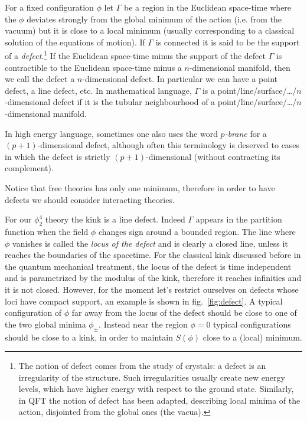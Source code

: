 \documentclass[../main/main.tex]{subfiles}
\begin{document}
For a fixed configuration $\phi$ let $\Gamma$ be a region in the Euclidean space-time where the $\phi$ deviates strongly from the global minimum of the action (i.e. from the vacuum) but it is close to a local minimum (usually corresponding to a classical solution of the equations of motion). 
If $\Gamma$ is connected it is said to be the support of a \emph{defect}.\footnote{The notion of defect comes from the study of crystals: a defect is an irregularity of the structure. Such irregularities usually create new energy levels, which have higher energy with respect to the ground state. Similarly, in QFT the notion of defect has been adapted, describing local minima of the action, disjointed from the global ones (the vacua).} 
If the Euclidean space-time minus the support of the defect $\Gamma$ is contractible to the Euclidean space-time minus a $n$-dimensional manifold, then we call the defect a $n$-dimensional defect. In particular we can have a point defect, a line defect, etc. In mathematical language, $\Gamma$ is a point/line/surface/\ldots/$n$-dimensional defect if it is the tubular neighbourhood of a point/line/surface/\ldots/$n$-dimensional manifold. 

In high energy language, sometimes one also uses the word \emph{$p$-brane} for a $(p+1)$-dimensional defect, although often this terminology is deserved to cases in which the defect is strictly $(p+1)$-dimensional (without contracting its complement). 

Notice that free theories has only one minimum, therefore in order to have defects we should consider interacting theories.

\skipline

For our $\phi_2^4$ theory the kink is a line defect. Indeed $\Gamma$ appears in the partition function when the field $\phi$ changes sign around a bounded region. The line where $\phi$ vanishes is called the \emph{locus of the defect} and is clearly a closed line, unless it reaches the boundaries of the spacetime.  For the classical kink discussed before in the quantum mechanical treatment, the locus of the defect is time independent and is parametrized by the modulus of the kink, therefore it reaches infinities and it is not closed. However, for the moment let's restrict ourselves on defects whose loci have compact support, an example is shown in fig.~\ref{fig:defect}. A typical configuration of $\phi$ far away from the locus of the defect should be close to one of the two global minima $\phi_\pm$. Instead near the region $\phi=0$ typical configurations should be close to a kink, in order to maintain $S(\phi)$ close to a (local) minimum. 
\end{document}
